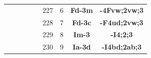 \documentclass{article}      %
\begin{document}
\begin{small}
\begin{longtable}[c]{|c|c|c|c|c|c|c|c|c|}
 & & & & &\textrm{227} & 6&\textbf{Fd-3m}&\textbf{-4Fvw;2vw;3} \\\cline{6-9}
 & & & & &\textrm{228} & 7&\textbf{Fd-3c}&\textbf{-F4ud;2vw;3} \\\cline{6-9}
 & & & & &\textrm{229} & 8&\textbf{Im-3}&\textbf{-I4;2;3} \\\cline{6-9}
 & & & & &\textrm{230} & 9&\textbf{Ia-3d}&\textbf{-I4bd;2ab;3} \\\hline
\end{longtable}
\end{small}

\clearpage     %
\end{document}

